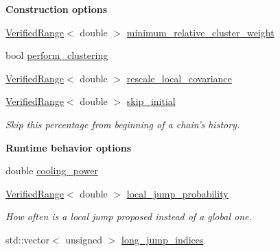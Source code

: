 \begin{Indent}{\bf Construction options}
\begin{DoxyCompactItemize}
\item 
\hyperlink{classeos_1_1VerifiedRange}{VerifiedRange}$<$ double $>$ \hyperlink{structeos_1_1proposal__functions_1_1GlobalLocal_1_1Config_ab46531993b150f25845f03a98046f768}{minimum\_\-relative\_\-cluster\_\-weight}
\item 
bool \hyperlink{structeos_1_1proposal__functions_1_1GlobalLocal_1_1Config_a42bdc4d80a759f9daab15d01b0edf4b6}{perform\_\-clustering}
\item 
\hyperlink{classeos_1_1VerifiedRange}{VerifiedRange}$<$ double $>$ \hyperlink{structeos_1_1proposal__functions_1_1GlobalLocal_1_1Config_a70f82cec4c0a992cf70a53c771e89c9d}{rescale\_\-local\_\-covariance}
\item 
\hyperlink{classeos_1_1VerifiedRange}{VerifiedRange}$<$ double $>$ \hyperlink{structeos_1_1proposal__functions_1_1GlobalLocal_1_1Config_aa325beb2f96d399f28841ee802fb5584}{skip\_\-initial}
\begin{DoxyCompactList}\small\item\em Skip this percentage from beginning of a chain's history. \item\end{DoxyCompactList}\end{DoxyCompactItemize}
\end{Indent}
\begin{Indent}{\bf Runtime behavior options}\par
{\em \label{_amgrpa7b8cf86c5424d8cf2c571d4b97d7ef9}
 }\begin{DoxyCompactItemize}
\item 
double \hyperlink{structeos_1_1proposal__functions_1_1GlobalLocal_1_1Config_afc5df7dfbda07b6296b48bb3147f91ab}{cooling\_\-power}
\item 
\hyperlink{classeos_1_1VerifiedRange}{VerifiedRange}$<$ double $>$ \hyperlink{structeos_1_1proposal__functions_1_1GlobalLocal_1_1Config_ad078b40f919f62b9311f433b1152bbb6}{local\_\-jump\_\-probability}
\begin{DoxyCompactList}\small\item\em How often is a local jump proposed instead of a global one. \item\end{DoxyCompactList}\item 
std::vector$<$ unsigned $>$ \hyperlink{structeos_1_1proposal__functions_1_1GlobalLocal_1_1Config_a81dad6982f265eccfc5f1d030f0ff5a7}{long\_\-jump\_\-indices}
\end{DoxyCompactItemize}
\end{Indent}


